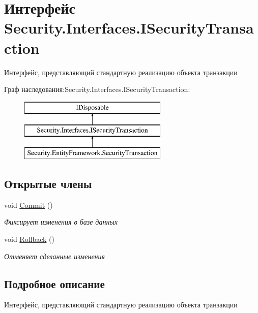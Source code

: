 \hypertarget{interface_security_1_1_interfaces_1_1_i_security_transaction}{}\section{Интерфейс Security.\+Interfaces.\+I\+Security\+Transaction}
\label{interface_security_1_1_interfaces_1_1_i_security_transaction}


Интерфейс, представляющий стандартную реализацию объекта транзакции  


Граф наследования\+:Security.\+Interfaces.\+I\+Security\+Transaction\+:\begin{figure}[H]
\begin{center}
\leavevmode
\includegraphics[height=3.000000cm]{d6/d17/interface_security_1_1_interfaces_1_1_i_security_transaction}
\end{center}
\end{figure}
\subsection*{Открытые члены}
\begin{DoxyCompactItemize}
\item 
void \hyperlink{interface_security_1_1_interfaces_1_1_i_security_transaction_a8c845571091b59511114ba3fa0613525}{Commit} ()
\begin{DoxyCompactList}\small\item\em Фиксирует изменения в базе данных \end{DoxyCompactList}\item 
void \hyperlink{interface_security_1_1_interfaces_1_1_i_security_transaction_afc9cfbc152639e831a753cad4e62b9d9}{Rollback} ()
\begin{DoxyCompactList}\small\item\em Отменяет сделанные изменения \end{DoxyCompactList}\end{DoxyCompactItemize}


\subsection{Подробное описание}
Интерфейс, представляющий стандартную реализацию объекта транзакции 




